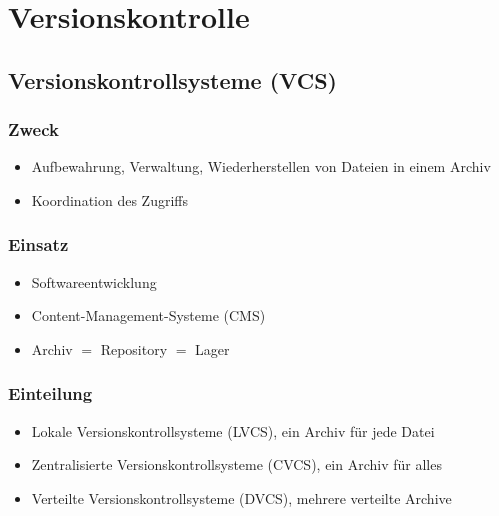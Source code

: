 \section{Versionskontrolle}
\subsection{Versionskontrollsysteme (VCS)}

\begin{multicols}{2}
	\subsubsection{Zweck}
	\begin{itemize}
		\item Aufbewahrung, Verwaltung, Wiederherstellen von Dateien \newline in einem Archiv
		\item Koordination des Zugriffs
	\end{itemize}
	
	\subsubsection{Einsatz}
	\begin{itemize}
		\item Softwareentwicklung
		\item Content-Management-Systeme (CMS)
		\item Archiv $=$ Repository $=$ Lager
	\end{itemize}
\end{multicols}

\subsubsection{Einteilung}
	\begin{itemize}
		\item Lokale Versionskontrollsysteme (LVCS), ein Archiv für jede Datei
		\item Zentralisierte Versionskontrollsysteme (CVCS), ein Archiv für alles
		\item Verteilte Versionskontrollsysteme (DVCS), mehrere verteilte Archive
\end{itemize}

